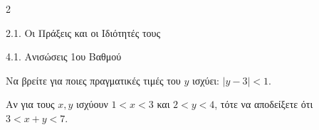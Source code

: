 \begin{ylh}{2}
    \item 2.1. Οι Πράξεις και οι Ιδιότητές τους
    \item 4.1. Ανισώσεις 1ου Βαθμού
\end{ylh}

\begin{alist}
\item Να βρείτε για ποιες πραγματικές τιμές του $y$ ισχύει: $|y - 3| < 1$.
\item Αν για τους $x, y$ ισχύουν $1 < x < 3$ και $2 < y < 4$, τότε να αποδείξετε ότι $3 < x + y < 7$.
\end{alist}

